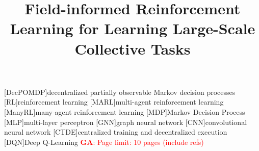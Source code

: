 \documentclass[conference]{IEEEtran}
\begin{document}
%
\title{Field-informed Reinforcement Learning for Learning Large-Scale Collective Tasks} %
%

\author{

\and
{}
\and
{}
}
%
\maketitle              %
%

\newcommand{\meta}[3]{\textcolor{#1}{\textbf{#2}: #3}}
\newcommand{\ga}[1]{\meta{red}{GA}{#1}}
\newcommand{\lukas}[1]{\meta{purple}{Lukas}{#1}}
\newcommand{\mv}[1]{\meta{green}{MV}{#1}}
[DecPOMDP]{decentralized partially observable Markov decision processes}
[RL]{reinforcement learning}
[MARL]{multi-agent reinforcement learning}
[ManyRL]{many-agent reinforcement learning}
[MDP]{Markov Decision Process}
[MLP]{multi-layer perceptron}
[GNN]{graph neural network}
[CNN]{convolutional neural network}
[CTDE]{centralized training and decentralized execution}
[DQN]{Deep Q-Learning}
\ga{Page limit: 10 pages (include refs)}
\end{document}
